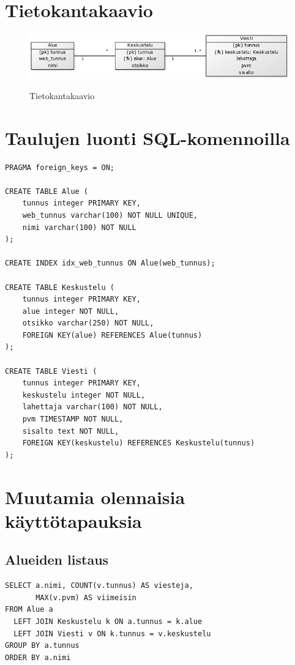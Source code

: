 \documentclass[titlepage]{article}
\begin{document}
\section*{Tietokantakaavio}

\begin{figure}[H]
\includegraphics[width=\textwidth]{tietokantakaavio}
\label{tkkaavio}
\caption{Tietokantakaavio}
\end{figure}

\section*{Taulujen luonti SQL-komennoilla}

\begin{verbatim}
PRAGMA foreign_keys = ON;

CREATE TABLE Alue (
    tunnus integer PRIMARY KEY,
    web_tunnus varchar(100) NOT NULL UNIQUE,
    nimi varchar(100) NOT NULL
);

CREATE INDEX idx_web_tunnus ON Alue(web_tunnus);

CREATE TABLE Keskustelu (
    tunnus integer PRIMARY KEY,
    alue integer NOT NULL,
    otsikko varchar(250) NOT NULL,
    FOREIGN KEY(alue) REFERENCES Alue(tunnus)
);

CREATE TABLE Viesti (
    tunnus integer PRIMARY KEY,
    keskustelu integer NOT NULL,
    lahettaja varchar(100) NOT NULL,
    pvm TIMESTAMP NOT NULL,
    sisalto text NOT NULL,
    FOREIGN KEY(keskustelu) REFERENCES Keskustelu(tunnus)
);
\end{verbatim}


\section*{Muutamia olennaisia käyttötapauksia}

\subsection*{Alueiden listaus}

\begin{verbatim}
SELECT a.nimi, COUNT(v.tunnus) AS viesteja, 
       MAX(v.pvm) AS viimeisin 
FROM Alue a
  LEFT JOIN Keskustelu k ON a.tunnus = k.alue
  LEFT JOIN Viesti v ON k.tunnus = v.keskustelu
GROUP BY a.tunnus
ORDER BY a.nimi
\end{verbatim}
\end{document}
